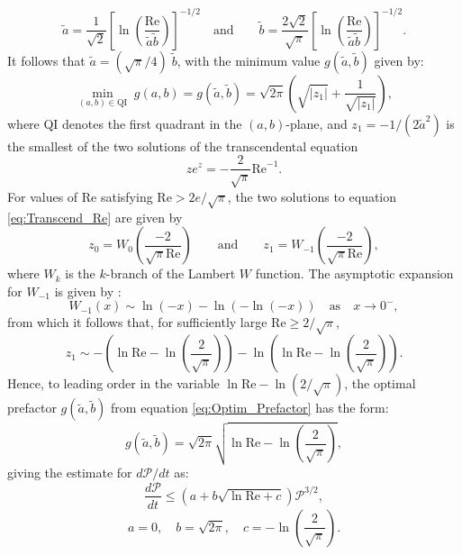 \documentclass[11pt]{article}
\def\P{{\mathcal{P}}}
\newcommand{\Reyn}{\textrm{Re}}
\begin{document}
\begin{equation*}
\tilde{a} = \frac{1}{\sqrt{2}}\left[\ln\left(\frac{\Reyn}{\tilde{a}\tilde{b}} \right)\right]^{-1/2} \quad\textrm{and}\qquad
\tilde{b} = \frac{2\sqrt{2}}{\sqrt{\pi}}\left[\ln\left(\frac{\Reyn}{\tilde{a}\tilde{b}} \right)\right]^{-1/2}.
\end{equation*}
It follows that $\tilde{a} = (\sqrt{\pi}/4)\;\tilde{b}$, with the minimum value $g(\tilde{a},\tilde{b})$ given by:
\begin{equation}\label{eq:Optim_Prefactor}
\mathop{\min}_{(a,b)\in \textrm{QI}} \; g(a,b) = g(\tilde{a},\tilde{b}) = \sqrt{2\pi}\left(\sqrt{|z_1|} + \frac{1}{\sqrt{|z_1|}}\right),
\end{equation}
where QI denotes the first quadrant in the $(a,b)$-plane, and $z_1 = - 1/(2\tilde{a}^2)$ is the smallest of the two solutions of the transcendental equation
\begin{equation}\label{eq:Transcend_Re}
ze^{z} = - \frac{2}{\sqrt{\pi}}\Reyn^{-1}.
\end{equation}
For values of $\Reyn$ satisfying $\Reyn > 2e/\sqrt{\pi}$, the two solutions to equation \eqref{eq:Transcend_Re} are given by
\begin{equation*}
z_0 = W_0\left(\frac{-2}{\sqrt{\pi}\Reyn}\right)\qquad\textrm{and}\qquad
z_1 = W_{-1}\left(\frac{-2}{\sqrt{\pi}\Reyn}\right),
\end{equation*} 
where $W_k$ is the $k$-branch of the Lambert $W$ function. The asymptotic expansion for $W_{-1}$ is given by  \cite{Corless1996}:
\begin{equation*}
W_{-1}(x) \sim \ln(-x) - \ln(-\ln(-x))\quad\textrm{as}\quad x\to 0^-, 
\end{equation*}
from which it follows that, for sufficiently large $\Reyn \geq 2/\sqrt{\pi}$, 
\begin{equation}
z_1 \sim - \left(\ln \Reyn - \ln\left( \frac{2}{\sqrt{\pi}}\right) \right) 
- \ln\left( \ln \Reyn - \ln\left( \frac{2}{\sqrt{\pi}}\right) \right).
\end{equation}
Hence, to leading order in the variable $\ln\Reyn - \ln(2/\sqrt{\pi})$, the optimal prefactor $g(\tilde{a},\tilde{b})$ from equation \eqref{eq:Optim_Prefactor} has the form:
\begin{equation*}
g(\tilde{a},\tilde{b}) = \sqrt{2\pi} \sqrt{\ln\Reyn - \ln\left(\frac{2}{\sqrt{\pi}}\right) },
\end{equation*}
giving the estimate for $d\P/dt$ as:
\begin{equation}\label{eq:dPdt_appendEstimate}
\frac{d\P}{dt} \leq \left(a + b \sqrt{ \ln\Reyn + c } \right) \P^{3/2},
\end{equation}
\[
a = 0, \quad b = \sqrt{2\pi},\quad c = - \ln\left(\frac{2}{\sqrt{\pi}}\right).
\]
\end{document}
